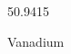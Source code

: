 \documentclass[12pt]{article}
\begin{document}
\hfill{}
\vfill
\begin{center}
  {\fontsize{50}{60}
  }

  \vspace{1em}

  50.9415

Vanadium
\end{center}
\vfill
\end{document}
